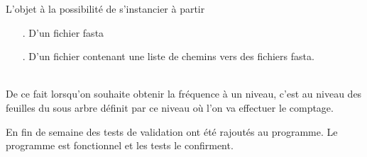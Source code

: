 L'objet à la possibilité de s'instancier à partir 
\begin{itemize}
 \item[.] D'un fichier fasta
 \item[.] D'un fichier contenant une liste de chemins vers des fichiers fasta.
\end{itemize}
~\\

De ce fait lorsqu'on souhaite obtenir la fréquence à un niveau, c'est au niveau des feuilles du sous arbre définit par ce niveau où l'on va effectuer le comptage.

En fin de semaine des tests de validation ont été rajoutés au programme. Le programme est fonctionnel et les tests le confirment.
